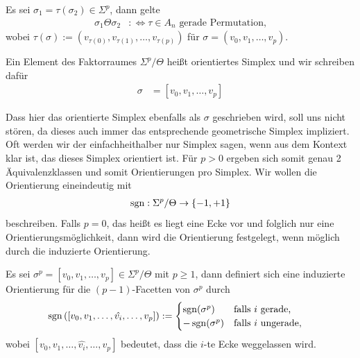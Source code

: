     \begin{definition}
      \label{defAeqRel}
      Es sei \( \sigma_{1} = \tau(\sigma_{2})\in\Sigma^{p} \), dann gelte
      \begin{align}
        \sigma_{1} \Theta \sigma_{2} &:\Leftrightarrow \tau \in A_{n} \text{ gerade Permutation,}
      \end{align}
      wobei \( \tau(\sigma) := \left( v_{\tau(0)}, v_{\tau(1)}, \ldots, v_{\tau(p)} \right) \) für \( \sigma = \left( v_{0}, v_{1}, \ldots, v_{p} \right) \).

      Ein Element des Faktorraumes \( \Sigma^{p}\slash\Theta \) heißt orientiertes Simplex und wir schreiben dafür
      \begin{align}
        \sigma &= \left[ v_{0}, v_{1}, \ldots, v_{p} \right]
      \end{align}
    \end{definition}

    Dass hier das orientierte Simplex ebenfalls als \( \sigma \) geschrieben wird, soll uns nicht stören, da dieses auch immer das entsprechende geometrische Simplex impliziert.
    Oft werden wir der einfachheithalber nur Simplex sagen, wenn aus dem Kontext klar ist, das dieses Simplex orientiert ist.
    Für \( p > 0 \) ergeben sich somit genau 2 Äquivalenzklassen und somit Orientierungen pro Simplex. 
    Wir wollen die Orientierung eineindeutig mit 
    \begin{align}
      \mathop{\mathrm{sgn}}\nolimits: \Sigma^{p}\slash\Theta \rightarrow \left\{ -1 , +1 \right\}
    \end{align}
    beschreiben.
    Falls \( p=0 \), das heißt es liegt eine Ecke vor und folglich nur eine Orientierungsmöglichkeit, dann wird die Orientierung festgelegt, wenn möglich durch die induzierte Orientierung.

    \begin{definition}
      \label{defIndOri}
      Es sei \( \sigma^{p} = \left[ v_{0}, v_{1}, \ldots, v_{p} \right] \in \Sigma^{p}\slash\Theta \) mit \( p \ge 1 \), 
      dann definiert sich eine induzierte Orientierung für die \( (p-1) \)-Facetten von \( \sigma^{p} \) durch
      \begin{align}
        \mathop{\mathrm{sgn}}\nolimits\left( \left[ v_{0}, v_{1}, \ldots, \hat{v_{i}}, \ldots, v_{p} \right] \right) &:=
        \begin{cases}
          \mathop{\mathrm{sgn}}\nolimits(\sigma^{p}) & \text{falls } i \text{ gerade,} \\
          -\mathop{\mathrm{sgn}}\nolimits(\sigma^{p}) & \text{falls } i \text{ ungerade,} 
        \end{cases}
      \end{align}
      wobei \( \left[ v_{0}, v_{1}, \ldots, \hat{v_{i}}, \ldots, v_{p} \right] \) bedeutet, dass die \( i \)-te Ecke weggelassen wird.
    \end{definition}

